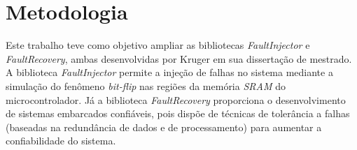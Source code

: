 
\chapter{Metodologia} \label{cap:metodologia}


Este trabalho teve como objetivo ampliar as bibliotecas \textit{FaultInjector} e \textit{FaultRecovery}, ambas desenvolvidas por Kruger \cite{Kruger:2014} em sua dissertação de mestrado. A biblioteca \textit{FaultInjector} permite a injeção de falhas no sistema mediante a simulação do fenômeno \textit{bit-flip} nas regiões da memória \textit{SRAM} do microcontrolador. Já a biblioteca \textit{FaultRecovery} proporciona o desenvolvimento de sistemas embarcados confiáveis, pois dispõe de técnicas de tolerância a falhas (baseadas na redundância de dados e de processamento) para aumentar a confiabilidade do sistema.



